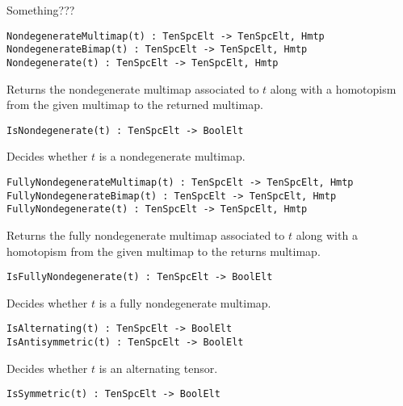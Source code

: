 \documentclass{amsart}
\begin{document}
Something??? %

\color{blue}
{\small \begin{verbatim}
NondegenerateMultimap(t) : TenSpcElt -> TenSpcElt, Hmtp
NondegenerateBimap(t) : TenSpcElt -> TenSpcElt, Hmtp
Nondegenerate(t) : TenSpcElt -> TenSpcElt, Hmtp
\end{verbatim} }
\color{black}

Returns the nondegenerate multimap associated to $t$ along with a homotopism 
from the given multimap to the returned multimap.

\color{blue}
{\small \begin{verbatim}
IsNondegenerate(t) : TenSpcElt -> BoolElt
\end{verbatim} }
\color{black}

Decides whether $t$ is a nondegenerate multimap.

\color{blue}
{\small \begin{verbatim}
FullyNondegenerateMultimap(t) : TenSpcElt -> TenSpcElt, Hmtp
FullyNondegenerateBimap(t) : TenSpcElt -> TenSpcElt, Hmtp
FullyNondegenerate(t) : TenSpcElt -> TenSpcElt, Hmtp
\end{verbatim} }
\color{black}

Returns the fully nondegenerate multimap associated to $t$ along with a
homotopism from the given multimap to the returns multimap.

\color{blue}
{\small \begin{verbatim}
IsFullyNondegenerate(t) : TenSpcElt -> BoolElt
\end{verbatim} }
\color{black}

Decides whether $t$ is a fully nondegenerate multimap.

\color{blue}
{\small \begin{verbatim}
IsAlternating(t) : TenSpcElt -> BoolElt
IsAntisymmetric(t) : TenSpcElt -> BoolElt
\end{verbatim} }
\color{black}

Decides whether $t$ is an alternating tensor.

\color{blue}
{\small \begin{verbatim}
IsSymmetric(t) : TenSpcElt -> BoolElt
\end{verbatim} }
\color{black}
\end{document}
